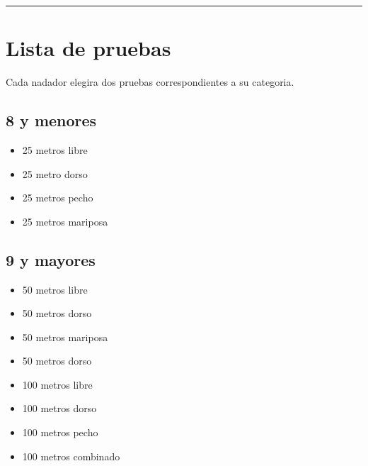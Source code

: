 \hrule
\section{Lista de pruebas}
Cada nadador elegira dos pruebas correspondientes a su categoria.
\subsection{8 y menores}
\begin{multicols}{2}
    \begin{center}
        \begin{itemize}
            \item 25 metros libre
            \item 25 metro dorso
            \item 25 metros pecho
            \item 25 metros mariposa
        \end{itemize}
    \end{center}
\end{multicols}
\subsection{9 y mayores}
\begin{multicols}{2}
    \begin{center}
        \begin{itemize}
            \item 50 metros libre
            \item 50 metros dorso
            \item 50 metros mariposa
            \item 50 metros dorso
            \item 100 metros libre
            \item 100 metros dorso
            \item 100 metros pecho
            \item 100 metros combinado
        \end{itemize}
    \end{center}
\end{multicols}